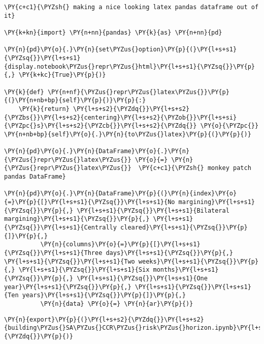     \begin{tcolorbox}[breakable, size=fbox, boxrule=1pt, pad at break*=1mm,colback=cellbackground, colframe=cellborder]
\begin{Verbatim}[commandchars=\\\{\}]
\PY{c+c1}{\PYZsh{} making a nice looking latex pandas dataframe out of it}

\PY{k+kn}{import} \PY{n+nn}{pandas} \PY{k}{as} \PY{n+nn}{pd}

\PY{n}{pd}\PY{o}{.}\PY{n}{set\PYZus{}option}\PY{p}{(}\PY{l+s+s1}{\PYZsq{}}\PY{l+s+s1}{display.notebook\PYZus{}repr\PYZus{}html}\PY{l+s+s1}{\PYZsq{}}\PY{p}{,} \PY{k+kc}{True}\PY{p}{)}

\PY{k}{def} \PY{n+nf}{\PYZus{}repr\PYZus{}latex\PYZus{}}\PY{p}{(}\PY{n+nb+bp}{self}\PY{p}{)}\PY{p}{:}
    \PY{k}{return} \PY{l+s+s2}{\PYZdq{}}\PY{l+s+s2}{\PYZbs{}}\PY{l+s+s2}{centering}\PY{l+s+s2}{\PYZob{}}\PY{l+s+si}{\PYZpc{}s}\PY{l+s+s2}{\PYZcb{}}\PY{l+s+s2}{\PYZdq{}} \PY{o}{\PYZpc{}} \PY{n+nb+bp}{self}\PY{o}{.}\PY{n}{to\PYZus{}latex}\PY{p}{(}\PY{p}{)}

\PY{n}{pd}\PY{o}{.}\PY{n}{DataFrame}\PY{o}{.}\PY{n}{\PYZus{}repr\PYZus{}latex\PYZus{}} \PY{o}{=} \PY{n}{\PYZus{}repr\PYZus{}latex\PYZus{}}  \PY{c+c1}{\PYZsh{} monkey patch pandas DataFrame}

\PY{n}{pd}\PY{o}{.}\PY{n}{DataFrame}\PY{p}{(}\PY{n}{index}\PY{o}{=}\PY{p}{[}\PY{l+s+s1}{\PYZsq{}}\PY{l+s+s1}{No margining}\PY{l+s+s1}{\PYZsq{}}\PY{p}{,} \PY{l+s+s1}{\PYZsq{}}\PY{l+s+s1}{Bilateral margining}\PY{l+s+s1}{\PYZsq{}}\PY{p}{,} \PY{l+s+s1}{\PYZsq{}}\PY{l+s+s1}{Centrally cleared}\PY{l+s+s1}{\PYZsq{}}\PY{p}{]}\PY{p}{,}
          \PY{n}{columns}\PY{o}{=}\PY{p}{[}\PY{l+s+s1}{\PYZsq{}}\PY{l+s+s1}{Three days}\PY{l+s+s1}{\PYZsq{}}\PY{p}{,} \PY{l+s+s1}{\PYZsq{}}\PY{l+s+s1}{Two weeks}\PY{l+s+s1}{\PYZsq{}}\PY{p}{,} \PY{l+s+s1}{\PYZsq{}}\PY{l+s+s1}{Six months}\PY{l+s+s1}{\PYZsq{}}\PY{p}{,} \PY{l+s+s1}{\PYZsq{}}\PY{l+s+s1}{One year}\PY{l+s+s1}{\PYZsq{}}\PY{p}{,} \PY{l+s+s1}{\PYZsq{}}\PY{l+s+s1}{Ten years}\PY{l+s+s1}{\PYZsq{}}\PY{p}{]}\PY{p}{,}
          \PY{n}{data} \PY{o}{=} \PY{n}{ar}\PY{p}{)}
\end{Verbatim}
\end{tcolorbox}

    \begin{tcolorbox}[breakable, size=fbox, boxrule=1pt, pad at break*=1mm,colback=cellbackground, colframe=cellborder]
\begin{Verbatim}[commandchars=\\\{\}]
\PY{n}{export}\PY{p}{(}\PY{l+s+s2}{\PYZdq{}}\PY{l+s+s2}{building\PYZus{}SA\PYZus{}CCR\PYZus{}risk\PYZus{}horizon.ipynb}\PY{l+s+s2}{\PYZdq{}}\PY{p}{)}
\end{Verbatim}
\end{tcolorbox}


